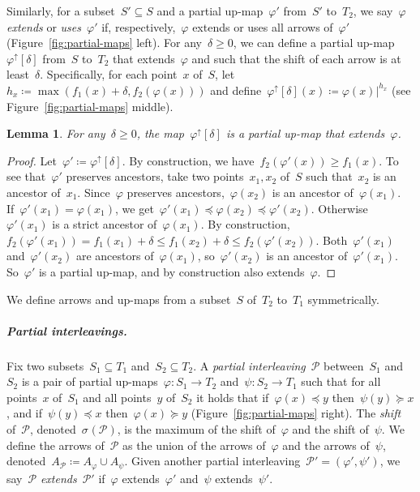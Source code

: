 \documentclass[11pt]{article}
\newtheorem{lemma}[theorem]{Lemma}
\newcommand{\an}[2]{#1|^{#2}}
\newcommand{\shift}[1]{\sigma_{#1}}
\renewcommand{\phi}{\varphi}
\renewcommand{\P}{\mathcal{P}}
\begin{document}
Similarly, for a subset~$S' \subseteq S$ and a partial up-map~$\phi'$ from~$S'$ to~$T_2$, we say~$\phi$ \emph{extends} or \emph{uses}~$\phi'$ if, respectively,~$\phi$ extends or uses all arrows of~$\phi'$ (Figure~\ref{fig:partial-maps} left).
%
For any~$\delta \ge 0$, we can define a partial up-map~$\phi^\uparrow[\delta]$ from~$S$ to~$T_2$ that extends~$\phi$ and such that the shift of each arrow is at least~$\delta$.
Specifically, for each point~$x$ of~$S$, let~$h_x \coloneqq \max(f_1(x) +\delta, f_2(\phi(x)))$ and define~$\phi^\uparrow[\delta](x) \coloneqq \an{\phi(x)}{h_x}$ (see Figure~\ref{fig:partial-maps} middle).
%
\begin{lemma}\label{lem:lifted}
	For any~$\delta \ge 0$, the map~$\phi^\uparrow[\delta]$ is a partial up-map that extends~$\phi$.
\end{lemma}
\begin{proof}
    Let~$\phi' \coloneqq \phi^\uparrow[\delta]$.
    By construction, we have~$f_2(\phi'(x)) \ge f_1(x)$.
	To see that~$\phi'$ preserves ancestors, take two points~$x_1, x_2$ of~$S$ such that~$x_2$ is an ancestor of~$x_1$.
	Since~$\phi$ preserves ancestors,~$\phi(x_2)$ is an ancestor of~$\phi(x_1)$.
	If~$\phi'(x_1) = \phi(x_1)$, we get~${\phi'(x_1) \preceq \phi(x_2) \preceq \phi'(x_2)}$.
	Otherwise~$\phi'(x_1)$ is a strict ancestor of~$\phi(x_1)$.
	By construction,~$f_2(\phi'(x_1)) = f_1(x_1) + \delta \le f_1(x_2) + \delta \le f_2(\phi'(x_2))$.
	Both~$\phi'(x_1)$ and~$\phi'(x_2)$ are ancestors of~$\phi(x_1)$, so~$\phi'(x_2)$ is an ancestor of~$\phi'(x_1)$.
	So~$\phi'$ is a partial up-map, and by construction also extends~$\phi$.
\end{proof}
%
\noindent
We define arrows and up-maps from a subset~$S$ of~$T_2$ to~$T_1$ symmetrically.
%
\subparagraph{Partial interleavings.}
Fix two subsets~$S_1 \subseteq T_1$ and~$S_2 \subseteq T_2$.
A \emph{partial interleaving}~$\P$ between~$S_1$ and~$S_2$ is a pair of partial up-maps~$\phi \colon S_1 \to T_2$ and~$\psi \colon S_2 \to T_1$ such that for all points~$x$ of~$S_1$ and all points~$y$ of~$S_2$ it holds that if~$\phi(x) \preceq y$ then~$\psi(y) \succeq x$, and if~$\psi(y) \preceq x$ then~$\phi(x) \succeq y$ (Figure~\ref{fig:partial-maps} right).
The \emph{shift} of~$\P$, denoted~$\shift{}(\P)$, is the maximum of the shift of~$\phi$ and the shift of~$\psi$.
We define the arrows of~$\P$ as the union of the arrows of~$\phi$ and the arrows of~$\psi$, denoted~$A_\P \coloneqq A_\phi \cup A_\psi$.
Given another partial interleaving~$\P' = (\phi', \psi')$, we say~$\P$ \emph{extends}~$\P'$ if~$\phi$ extends~$\phi'$ and~$\psi$ extends~$\psi'$.
\end{document}
